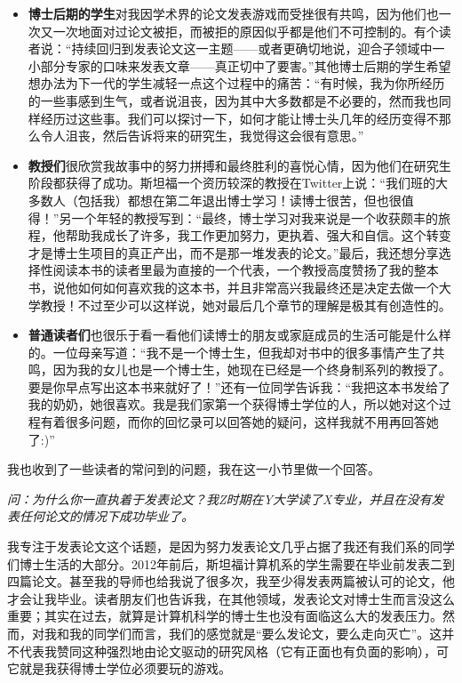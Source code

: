 \documentclass[12pt,UTF8,nofonts]{book}
\begin{document}
\begin{itemize}
  \item \textbf{博士后期的学生}对我因学术界的论文发表游戏而受挫很有共鸣，因为他们也一次又一次地面对过论文被拒，而被拒的原因似乎都是他们不可控制的。有个读者说：“持续回归到发表论文这一主题——或者更确切地说，迎合子领域中一小部分专家的口味来发表文章——真正切中了要害。”其他博士后期的学生希望想办法为下一代的学生减轻一点这个过程中的痛苦：“有时候，我为你所经历的一些事感到生气，或者说沮丧，因为其中大多数都是不必要的，然而我也同样经历过这些事。我们可以探讨一下，如何才能让博士头几年的经历变得不那么令人沮丧，然后告诉将来的研究生，我觉得这会很有意思。”
  \item \textbf{教授们}很欣赏我故事中的努力拼搏和最终胜利的喜悦心情，因为他们在研究生阶段都获得了成功。斯坦福一个资历较深的教授在Twitter上说：“我们班的大多数人（包括我）都想在第二年退出博士学习！读博士很苦，但也很值得！”另一个年轻的教授写到：“最终，博士学习对我来说是一个收获颇丰的旅程，他帮助我成长了许多，我工作更加努力，更执着、强大和自信。这个转变才是博士生项目的真正产出，而不是那一堆发表的论文。”最后，我还想分享选择性阅读本书的读者里最为直接的一个代表，一个教授高度赞扬了我的整本书，说他如何如何喜欢我的这本书，并且非常高兴我最终还是决定去做一个大学教授！不过至少可以这样说，她对最后几个章节的理解是极其有创造性的。
  \item \textbf{普通读者们}也很乐于看一看他们读博士的朋友或家庭成员的生活可能是什么样的。一位母亲写道：“我不是一个博士生，但我却对书中的很多事情产生了共鸣，因为我的女儿也是一个博士生，她现在已经是一个终身制系列的教授了。要是你早点写出这本书来就好了！”还有一位同学告诉我：“我把这本书发给了我的奶奶，她很喜欢。我是我们家第一个获得博士学位的人，所以她对这个过程有着很多问题，而你的回忆录可以回答她的疑问，这样我就不用再回答她了:)”
\end{itemize}

\breakline

我也收到了一些读者的常问到的问题，我在这一小节里做一个回答。

\emph{问：为什么你一直执着于发表论文？我Z时期在Y大学读了X专业，并且在没有发表任何论文的情况下成功毕业了。}

我专注于发表论文这个话题，是因为努力发表论文几乎占据了我还有我们系的同学们博士生活的大部分。2012年前后，斯坦福计算机系的学生需要在毕业前发表二到四篇论文。甚至我的导师也给我说了很多次，我至少得发表两篇被认可的论文，他才会让我毕业。读者朋友们也告诉我，在其他领域，发表论文对博士生而言没这么重要；其实在过去，就算是计算机科学的博士生也没有面临这么大的发表压力。然而，对我和我的同学们而言，我们的感觉就是“要么发论文，要么走向灭亡”。这并不代表我赞同这种强烈地由论文驱动的研究风格（它有正面也有负面的影响），可它就是我获得博士学位必须要玩的游戏。
\end{document}
